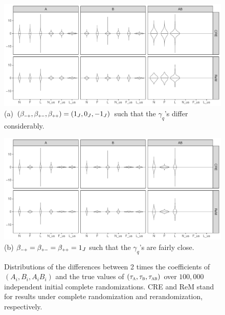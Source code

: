 \documentclass[11pt]{article}
\theoremstyle{definition}
\begin{document}
\begin{figure}


 
\begin{center}
\includegraphics[width= \textwidth]{main_sep_factor_Q4_1eq2_N100_J20_diffb_22_23_24_31_nRep1e+05.pdf}
(a) $(\beta_{\mmm\pp}, \beta_{\pp\mmm}, \beta_{\pp\pp})  = (1_J, 0_J, -1_J)$ such that the $\gamma_q$'s differ considerably.
\end{center}


 \begin{center}
\includegraphics[width= \textwidth]{main_sep_factor_Q4_1eq2_N100_J20_sameb_22_23_24_31_nRep1e+05.pdf}
(b) $\beta_{\mmm\pp}=\beta_{\pp\mmm}= \beta_{\pp\pp} = 1_J$ such that the $\gamma_q$'s are fairly close.
\end{center}

\caption{\label{fig} Distributions of the differences between 2 times the \olss coefficients of $(A_i, B_i, A_iB_i)$ and the true values of $(\tau_{\textsc{a}}, \tau_{\textsc{b}} 	, \tau_{\textsc{ab}})$ over $100,000$ independent initial complete randomizations. CRE and ReM stand for results under complete randomization and rerandomization, respectively.}
\end{figure}
\end{document}
